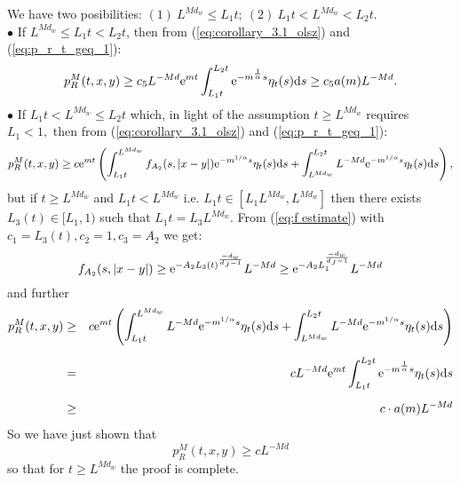 \documentclass[11pt]{article}
\begin{document}
We have two posibilities: $(1) \ L^{Md_w} \leq L_1t; \ (2) \ L_1t < L^{Md_w} < L_2t.$\\
$\bullet$ If $L^{Md_{w}}\leq L_{1}t < L_{2}t$, then from (\ref{eq:corollary_3.1_olsz}) and (\ref{eq:p_r_t_geq_1}):
$$
p^M_R(t,x,y) \geq c_5L^{-Md}{\rm e}^{mt}\int_{L_{1}t}^{L_{2}t}{\rm e}^{-m^{\frac{1}{\alpha}}s}\eta_{t}(s){\rm d}s \geq c_5a(m)L^{-Md}.
$$
$\bullet$ If $ L_{1}t < L^{Md_{w}} \leq L_{2}t$ which, in light of the assumption $t \geq L^{Md_w}$ requires $L_1 < 1,$ then from (\ref{eq:corollary_3.1_olsz}) and (\ref{eq:p_r_t_geq_1}):
$$
p^M_R(t,x,y) \geq c {\rm e}^{mt}\left(\int_{L_{1}t}^{L^{Md_{w}}}f_{A_2}(s,|x-y|){\rm e}^{-m^{1/\alpha}s}\eta_{t}(s){\rm d} s + \int_{L^{Md_{w}}}^{L_{2}t}L^{-Md}{\rm e}^{-m^{1/\alpha}s}\eta_{t}(s){\rm d} s\right),
$$
but if $ t \geq L^{Md_{w}}$ and $ L_{1}t < L^{Md_{w}}$ i.e. $L_1t \in[L_1L^{Md_w},L^{Md_w}]$ then there exists $L_{3}(t) \in  [L_{1},1)$ such that $L_{1}t = L_{3}L^{Md_{w}}.$ From (\ref{eq:f estimate}) with $c_1 = L_3(t), c_2 = 1, c_3 = A_2$ we get:
$$
f_{A_2}(s,|x-y|) \geq {\rm e}^{-A_2L_3(t)^{\frac{-d_w}{d_J-1}}}L^{-Md} \geq {\rm e}^{-A_2L_1^{\frac{-d_w}{d_J-1}}}L^{-Md}
$$
and further
\begin{eqnarray*}
p^M_R(t,x,y) & \geq  & c{\rm e}^{mt}\left(\int_{L_{1}t}^{L^{Md_{w}}}L^{-Md}{\rm e}^{-m^{1/\alpha}s}\eta_{t}(s){\rm d} s + \int_{L^{Md_{w}}}^{L_{2}t}L^{-Md}{\rm e}^{-m^{1/\alpha}s}\eta_{t}(s){\rm d} s\right) \\[2mm]
& = & cL^{-Md}{\rm e}^{mt}\int_{L_{1}t}^{L_{2}t}{\rm e}^{-m^{\frac{1}{\alpha}}s}\eta_{t}(s){\rm d}s \\[2mm]
& \geq & c\cdot a(m) L^{-Md}
\end{eqnarray*}
So we have just shown that
$$
p^M_R(t,x,y) \geq  cL^{-Md}
$$
so that for $t \geq L^{Md_{w}}$ the proof is complete.\\
\end{document}
